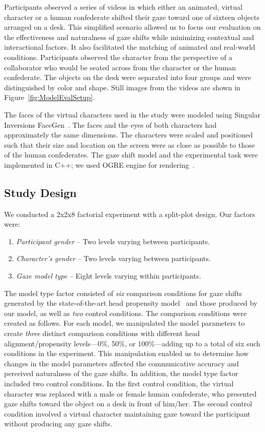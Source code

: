 Participants observed a series of videos in which either an animated, virtual character or a human confederate shifted their gaze toward one of sixteen objects arranged on a desk. This simplified scenario allowed us to focus our evaluation on the effectiveness and naturalness of gaze shifts while minimizing contextual and interactional factors. It also facilitated the matching of animated and real-world conditions. Participants observed the character from the perspective of a collaborator who would be seated across from the character or the human confederate. The objects on the desk were separated into four groups and were distinguished by color and shape. Still images from the videos are shown in Figure~\ref{fig:ModelEvalSetup}.

The faces of the virtual characters used in the study were modeled using Singular Inversions FaceGen~\cite{facegen}. The faces and the eyes of both characters had approximately the same dimensions. The characters were scaled and positioned such that their size and location on the screen were as close as possible to those of the human confederates. The gaze shift model and the experimental task were implemented in C++; we used OGRE engine for rendering~\cite{ogre3d}.

\subsection{Study Design}

We conducted a 2x2x8 factorial experiment with a split-plot design. Our factors were:

\begin{enumerate}
\item \emph{Participant gender} -- Two levels varying between participants.
\item \emph{Character's gender} -- Two levels varying between participants.
\item \emph{Gaze model type} -- Eight levels varying within participants.
\end{enumerate}

The model type factor consisted of \emph{six} comparison conditions for gaze shifts generated by the state-of-the-art head propensity model~\cite{peters2010animating} and those produced by our model, as well as \emph{two} control conditions. The comparison conditions were created as follows. For each model, we manipulated the model parameters to create \emph{three} distinct comparison conditions with different head alignment/propensity levels---0\%, 50\%, or 100\%---adding up to a total of six such conditions in the experiment. This manipulation enabled us to determine how changes in the model parameters affected the communicative accuracy and perceived naturalness of the gaze shifts. In addition, the model type factor included two control conditions. In the first control condition, the virtual character was replaced with a male or female human confederate, who presented gaze shifts toward the object on a desk in front of him/her. The second control condition involved a virtual character maintaining gaze toward the participant without producing any gaze shifts.


